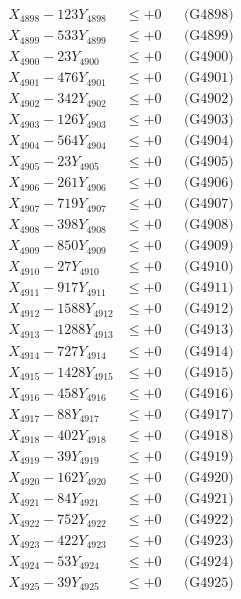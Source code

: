 \documentclass[a4paper,10pt]{article}
\begin{document}
{\begin{align}
X_{4898} - 123Y_{4898} &\leq +0 && \text{(G4898)} \\
X_{4899} - 533Y_{4899} &\leq +0 && \text{(G4899)} \\
X_{4900} - 23Y_{4900} &\leq +0 && \text{(G4900)} \\
\allowbreak
X_{4901} - 476Y_{4901} &\leq +0 && \text{(G4901)} \\
X_{4902} - 342Y_{4902} &\leq +0 && \text{(G4902)} \\
X_{4903} - 126Y_{4903} &\leq +0 && \text{(G4903)} \\
X_{4904} - 564Y_{4904} &\leq +0 && \text{(G4904)} \\
X_{4905} - 23Y_{4905} &\leq +0 && \text{(G4905)} \\
X_{4906} - 261Y_{4906} &\leq +0 && \text{(G4906)} \\
X_{4907} - 719Y_{4907} &\leq +0 && \text{(G4907)} \\
X_{4908} - 398Y_{4908} &\leq +0 && \text{(G4908)} \\
X_{4909} - 850Y_{4909} &\leq +0 && \text{(G4909)} \\
X_{4910} - 27Y_{4910} &\leq +0 && \text{(G4910)} \\
\allowbreak
X_{4911} - 917Y_{4911} &\leq +0 && \text{(G4911)} \\
X_{4912} - 1588Y_{4912} &\leq +0 && \text{(G4912)} \\
X_{4913} - 1288Y_{4913} &\leq +0 && \text{(G4913)} \\
X_{4914} - 727Y_{4914} &\leq +0 && \text{(G4914)} \\
X_{4915} - 1428Y_{4915} &\leq +0 && \text{(G4915)} \\
X_{4916} - 458Y_{4916} &\leq +0 && \text{(G4916)} \\
X_{4917} - 88Y_{4917} &\leq +0 && \text{(G4917)} \\
X_{4918} - 402Y_{4918} &\leq +0 && \text{(G4918)} \\
X_{4919} - 39Y_{4919} &\leq +0 && \text{(G4919)} \\
X_{4920} - 162Y_{4920} &\leq +0 && \text{(G4920)} \\
\allowbreak
X_{4921} - 84Y_{4921} &\leq +0 && \text{(G4921)} \\
X_{4922} - 752Y_{4922} &\leq +0 && \text{(G4922)} \\
X_{4923} - 422Y_{4923} &\leq +0 && \text{(G4923)} \\
X_{4924} - 53Y_{4924} &\leq +0 && \text{(G4924)} \\
X_{4925} - 39Y_{4925} &\leq +0 && \text{(G4925)} \\

\end{align}}
\end{document}
